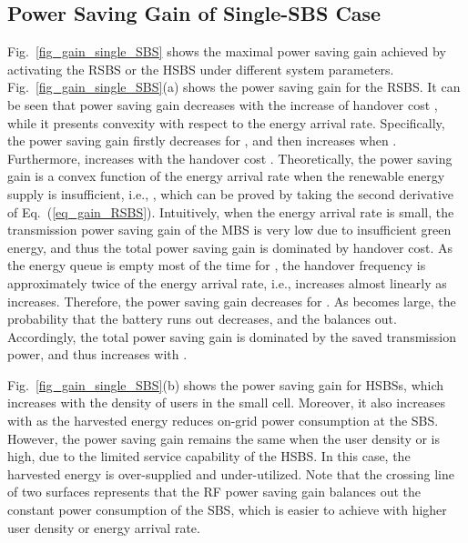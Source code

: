 \documentclass[12pt, draftclsnofoot,onecolumn]{IEEEtran}
\begin{document}
\subsection{Power Saving Gain of Single-SBS Case}

    \begin{figure*}[!t]
        \centering
\hfil
        \caption{Power saving gain of single SBS.}
        \label{fig_gain_single_SBS}
    \end{figure*}

Fig.~\ref{fig_gain_single_SBS} shows the maximal power saving gain achieved by activating the RSBS or the HSBS under different system parameters. Fig.~\ref{fig_gain_single_SBS}(a) shows the power saving gain for the RSBS.
It can be seen that power saving gain decreases with the increase of handover cost , while it presents convexity with respect to the energy arrival rate.
Specifically, the power saving gain firstly decreases for , and then increases when .
Furthermore,  increases with the handover cost .
Theoretically, the power saving gain is a convex function of the energy arrival rate when the renewable energy supply is insufficient, i.e., , which can be proved by taking the second derivative of Eq.~(\ref{eq_gain_RSBS}).
Intuitively, when the energy arrival rate  is small, the transmission power saving gain of the MBS  is very low due to insufficient green energy, and thus the total power saving gain is dominated by handover cost.
As the energy queue is empty most of the time for , the handover frequency is approximately twice of the energy arrival rate, i.e.,  increases almost linearly as  increases.
Therefore, the power saving gain decreases for .
As  becomes large, the probability that the battery runs out decreases, and the  balances  out.
Accordingly, the total power saving gain is dominated by the saved transmission power, and thus increases with .

Fig.~\ref{fig_gain_single_SBS}(b) shows the power saving gain for HSBSs, which increases with the density of users in the small cell. Moreover, it also increases with  as the harvested energy reduces on-grid power consumption at the SBS. However, the power saving gain remains the same when the user density or  is high, due to the limited service capability of the HSBS. In this case, the harvested energy is over-supplied and under-utilized. Note that the crossing line of two surfaces represents that the RF power saving gain balances out the constant power consumption of the SBS, which is easier to achieve with higher user density or energy arrival rate.
\end{document}
